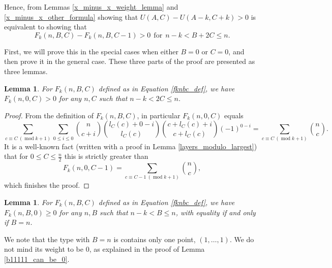 \documentclass[11pt, reqno]{amsart}
\newtheorem{lemma}[theorem]{Lemma}
\numberwithin{equation}{section}
\newcommand\modd{\operatorname{mod}}
\begin{document}
Hence, from Lemmas \ref{x_minus_x_weight_lemma} and \ref{x_minus_x_other_formula} showing that $U(A, C)-U(A-k, C+k)>0$ is equivalent to showing that
\begin{equation*}
    F_k(n, B, C) - F_k(n, B, C-1)>0 \ \ \text{for} \ \ n-k < B+2C \leqslant n.
\end{equation*}

First, we will prove this in the special cases when either $B=0$ or $C=0$, and then prove it in the general case. These three parts of the proof are presented as three lemmas.

\begin{lemma}
\label{b_is_0}
    For $F_k(n, B, C)$ defined as in Equation \ref{fknbc_def}, we have $F_k(n, 0, C)>0$ for any $n, C$ such that $n-k < 2C \leqslant n$.
\end{lemma}

\begin{proof}
    From the definition of $F_k(n, B, C)$, in particular $F_k(n, 0, C)$ equals
    \begin{equation*}
        \sum_{c \equiv C \ (\modd k+1)} \sum_{0 \leqslant i \leqslant 0} \binom{n}{c+i}\binom{l_C(c)+0-i}{l_C(c)}\binom{c+l_C(c)+i}{c+l_C(c)} (-1)^{0-i}
        = \sum_{c \equiv C \ (\modd k+1)} \binom{n}{c}.
    \end{equation*}
    It is a well-known fact (written with a proof in Lemma \ref{layers_modulo_largest}) that for $0 \leqslant C \leqslant \frac{n}{2}$ this is strictly greater than
    \begin{equation*}
        F_k(n, 0, C-1) = \sum_{c \equiv C-1 \ (\modd k+1)} \binom{n}{c},
    \end{equation*}
    which finishes the proof.
\end{proof}

\begin{lemma}
\label{c_is_0}
    For $F_k(n, B, C)$ defined as in Equation \ref{fknbc_def}, we have $F_k(n, B, 0) \geqslant 0$ for any $n, B$ such that $n-k < B \leqslant n$, with equality if and only if $B=n$.
\end{lemma}

We note that the type with $B=n$ is contains only one point, $(1, \dots, 1)$. We do not mind its weight to be $0$, as explained in the proof of Lemma \ref{b11111_can_be_0}.
\end{document}
